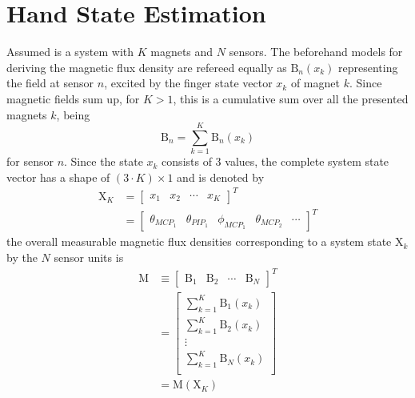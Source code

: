\section{Hand State Estimation} \label{sec:estimation}

Assumed is a system with $ K $ magnets and $ N $ sensors. The beforehand models for deriving the magnetic flux density are refereed equally as $ \mathrm{B}_{n}(x_{k}) $ representing the field at sensor $ n $, excited by the finger state vector $ x_{k} $ of magnet $ k $. Since magnetic fields sum up, for $ K > 1 $, this is a cumulative sum over all the presented magnets $ k $, being
\begin{equation}
\mathrm{B}_{n} = \sum_{k=1}^{K} \mathrm{B}_n(x_{k})
\end{equation}
for sensor $ n $. Since the state $ x_{k} $ consists of 3 values, the complete system state vector has a shape of $ (3 \cdot K) \times 1 $ and is denoted by
\begin{equation}
\begin{aligned}
\mathrm{X}_K &= \begin{bmatrix} x_{1} & x_{2} & \cdots & x_{K}  \end{bmatrix}^{T}\\
 &= \begin{bmatrix} \theta_{MCP_{1}} & \theta_{PIP_{1}} & \phi_{MCP_{1}} & \theta_{MCP_{2}} & \cdots \end{bmatrix}^{T}
\end{aligned}
\end{equation}
the overall measurable magnetic flux densities corresponding to a system state $ \mathrm{X}_{k} $ by the $ N $ sensor units is 
\begin{equation}
\begin{aligned}
\mathrm{M} &\equiv \begin{bmatrix} {\mathrm{B}}_{1} & {\mathrm{B}}_{2} & \cdots & {\mathrm{B}}_{N} \end{bmatrix}^{T}\\
		&= \begin{bmatrix}
			\sum_{k=1}^{K} \mathrm{B}_1(x_{k})\\
			\sum_{k=1}^{K} \mathrm{B}_2(x_{k})\\
			\vdots \\
		    \sum_{k=1}^{K} \mathrm{B}_N(x_{k})\\
		\end{bmatrix} \\
	    &= \mathrm{M}(\mathrm{X}_K)
\end{aligned}
\end{equation}
